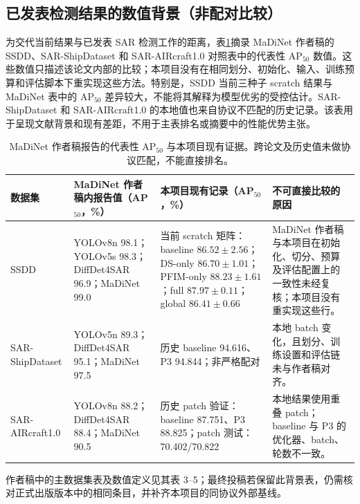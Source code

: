 \documentclass[UTF8,12pt,a4paper]{ctexart}
\begin{document}
\subsection{已发表检测结果的数值背景（非配对比较）}
为交代当前结果与已发表 SAR 检测工作的距离，表\ref{tab:literature_context}摘录 MaDiNet 作者稿的 SSDD、SAR-ShipDataset 和 SAR-AIRcraft1.0 对照表中的代表性 AP$_{50}$ 数值\cite{madinet_preprint}。这些数值只描述该论文内部的比较；本项目没有在相同划分、初始化、输入、训练预算和评估脚本下重实现这些方法。特别是，SSDD 当前三种子 scratch 结果与 MaDiNet 表中的 AP$_{50}$ 差异较大，不能将其解释为模型优劣的受控估计。SAR-ShipDataset 和 SAR-AIRcraft1.0 的本地值也来自协议不匹配的历史记录。该表用于呈现文献背景和现有差距，不用于主表排名或摘要中的性能优势主张。
\begin{table}[H]\centering\scriptsize
\caption{MaDiNet 作者稿报告的代表性 AP$_{50}$ 与本项目现有证据。跨论文及历史值未做协议匹配，不能直接排名。}
\label{tab:literature_context}
\begin{tabularx}{\linewidth}{p{1.65cm}XXp{3.45cm}}
\toprule
数据集 & MaDiNet 作者稿内报告值（AP$_{50}$，\%） & 本项目现有记录（AP$_{50}$，\%） & 不可直接比较的原因\\
\midrule
SSDD & YOLOv8n 98.1；YOLOv5s 98.3；DiffDet4SAR 96.9；MaDiNet 99.0 & 当前 scratch 矩阵：baseline $86.52\pm2.56$；DS-only $86.70\pm1.01$；PFIM-only $88.23\pm1.61$；full $87.97\pm0.11$；global $86.41\pm0.66$ & MaDiNet 作者稿与本项目在初始化、切分、预算及评估配置上的一致性未经复核；本项目没有重实现这些行。\\
SAR-ShipDataset & YOLOv5n 89.3；DiffDet4SAR 95.1；MaDiNet 97.5 & 历史 baseline 94.616、P3 94.844；非严格配对 & 本地 batch 变化，且划分、训练设置和评估链未与作者稿对齐。\\
SAR-AIRcraft1.0 & YOLOv8n 88.2；DiffDet4SAR 88.4；MaDiNet 90.5 & 历史 patch 验证：baseline 87.751、P3 88.825；patch 测试：70.402/70.822 & 本地结果使用重叠 patch；baseline 与 P3 的优化器、batch、轮数不一致。\\
\bottomrule
\end{tabularx}
\end{table}
作者稿中的主数据集表及数值定义见其表 3--5；最终投稿若保留此背景表，仍需核对正式出版版本中的相同条目，并补齐本项目的同协议外部基线。
\end{document}
